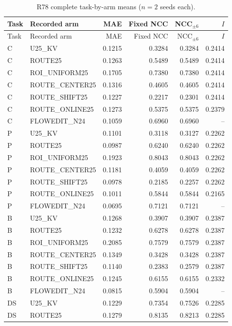 \begingroup\scriptsize\setlength{\tabcolsep}{2pt}
\begin{longtable}{lp{.30\linewidth}rrrr}
\caption{R78 complete task-by-arm means ($n=2$ seeds each).}\\
\hline
Task & Recorded arm & MAE & Fixed NCC & NCC$_{\pm6}$ & $I$ \\ \hline
\endfirsthead
\hline
Task & Recorded arm & MAE & Fixed NCC & NCC$_{\pm6}$ & $I$ \\ \hline
\endhead
C & U25\_KV & 0.1215 & 0.3284 & 0.3284 & 0.2414 \\
C & ROUTE25 & 0.1263 & 0.5489 & 0.5489 & 0.2414 \\
C & ROI\_UNIFORM25 & 0.1705 & 0.7380 & 0.7380 & 0.2414 \\
C & ROUTE\_CENTER25 & 0.1316 & 0.4605 & 0.4605 & 0.2414 \\
C & ROUTE\_SHIFT25 & 0.1227 & 0.2217 & 0.2301 & 0.2414 \\
C & ROUTE\_ONLINE25 & 0.1273 & 0.5375 & 0.5375 & 0.2379 \\
C & FLOWEDIT\_N24 & 0.1059 & 0.6960 & 0.6960 & -- \\
P & U25\_KV & 0.1101 & 0.3118 & 0.3127 & 0.2262 \\
P & ROUTE25 & 0.0987 & 0.6240 & 0.6240 & 0.2262 \\
P & ROI\_UNIFORM25 & 0.1923 & 0.8043 & 0.8043 & 0.2262 \\
P & ROUTE\_CENTER25 & 0.1181 & 0.4059 & 0.4059 & 0.2262 \\
P & ROUTE\_SHIFT25 & 0.0978 & 0.2185 & 0.2257 & 0.2262 \\
P & ROUTE\_ONLINE25 & 0.1011 & 0.5844 & 0.5844 & 0.2165 \\
P & FLOWEDIT\_N24 & 0.0695 & 0.7121 & 0.7121 & -- \\
B & U25\_KV & 0.1268 & 0.3907 & 0.3907 & 0.2387 \\
B & ROUTE25 & 0.1232 & 0.6278 & 0.6278 & 0.2387 \\
B & ROI\_UNIFORM25 & 0.2085 & 0.7579 & 0.7579 & 0.2387 \\
B & ROUTE\_CENTER25 & 0.1349 & 0.3428 & 0.3428 & 0.2387 \\
B & ROUTE\_SHIFT25 & 0.1140 & 0.2383 & 0.2579 & 0.2387 \\
B & ROUTE\_ONLINE25 & 0.1245 & 0.6155 & 0.6155 & 0.2332 \\
B & FLOWEDIT\_N24 & 0.0815 & 0.5904 & 0.5904 & -- \\
DS & U25\_KV & 0.1229 & 0.7354 & 0.7526 & 0.2285 \\
DS & ROUTE25 & 0.1279 & 0.8135 & 0.8213 & 0.2285 \\

\end{longtable}
